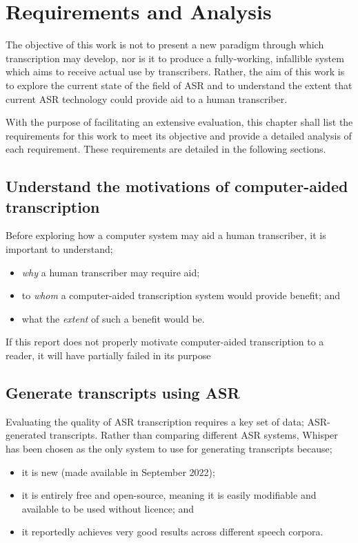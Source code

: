 \chapter{Requirements and Analysis}\label{ch:req-and-analysis}

The objective of this work is not to present a new paradigm through which transcription may develop, nor is it to produce a fully-working, infallible system which aims to receive actual use by transcribers.
Rather, the aim of this work is to explore the current state of the field of ASR and to understand the extent that current ASR technology could provide aid to a human transcriber.

With the purpose of facilitating an extensive evaluation, this chapter shall list the requirements for this work to meet its objective and provide a detailed analysis of each requirement.
These requirements are detailed in the following sections.

\section{Understand the motivations of computer-aided transcription}

Before exploring how a computer system may aid a human transcriber, it is important to understand;

\begin{itemize}
        \item \emph{why} a human transcriber may require aid;
        \item to \emph{whom} a computer-aided transcription system would provide benefit; and
        \item what the \emph{extent} of such a benefit would be.
\end{itemize}

If this report does not properly motivate computer-aided transcription to a reader, it will have partially failed in its purpose 

\section{Generate transcripts using ASR}

Evaluating the quality of ASR transcription requires a key set of data; ASR-generated transcripts.
Rather than comparing different ASR systems, Whisper\cite{whisper} has been chosen as the only system to use for generating transcripts because;

\begin{itemize}
        \item it is new (made available in September 2022);
        \item it is entirely free and open-source, meaning it is easily modifiable and available to be used without licence; and
        \item it reportedly achieves very good results across different speech corpora.
\end{itemize}

